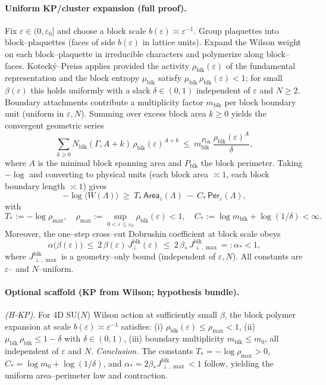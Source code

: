 \documentclass[11pt]{amsart}
\theoremstyle{plain}
\theoremstyle{definition}
\theoremstyle{remark}
\begin{document}
\paragraph{Uniform KP/cluster expansion (full proof).}
Fix $\varepsilon\in(0,\varepsilon_0]$ and choose a block scale $b(\varepsilon)\asymp \varepsilon^{-1}$. Group plaquettes into block–plaquettes (faces of side $b(\varepsilon)$ in lattice units). Expand the Wilson weight on each block–plaquette in irreducible characters and polymerize along block–faces. Koteck\'y–Preiss applies provided the activity $\rho_{\mathrm{blk}}(\varepsilon)$ of the fundamental representation and the block entropy $\mu_{\mathrm{blk}}$ satisfy $\mu_{\mathrm{blk}}\,\rho_{\mathrm{blk}}(\varepsilon) < 1$; for small $\beta(\varepsilon)$ this holds uniformly with a slack $\delta\in(0,1)$ independent of $\varepsilon$ and $N\ge2$. Boundary attachments contribute a multiplicity factor $m_{\mathrm{blk}}$ per block boundary unit (uniform in $\varepsilon,N$). Summing over excess block area $k\ge0$ yields the convergent geometric series
\[
  \sum_{k\ge 0} N_{\mathrm{blk}}(\Gamma,A+k)\,\rho_{\mathrm{blk}}(\varepsilon)^{A+k}
   \ \le\ m_{\mathrm{blk}}^{P_{\mathrm{blk}}}\,\frac{\rho_{\mathrm{blk}}(\varepsilon)^{A}}{\delta},
\]
where $A$ is the minimal block spanning area and $P_{\mathrm{blk}}$ the block perimeter. Taking $-\log$ and converting to physical units (each block area $\asymp 1$, each block boundary length $\asymp 1$) gives
\[
  -\log\langle W(\Lambda)\rangle\ \ge\ T_*\,\mathsf{Area}_\varepsilon(\Lambda)\ -\ C_*\,\mathsf{Per}_\varepsilon(\Lambda),
\]
with
\[
  T_*:= -\log \rho_{\max},\quad \rho_{\max}:=\sup_{0<\varepsilon\le\varepsilon_0}\rho_{\mathrm{blk}}(\varepsilon)<1,\quad
  C_*:= \log m_{\mathrm{blk}}+\log(1/\delta)<\infty.
\]
Moreover, the one–step cross–cut Dobrushin coefficient at block scale obeys
\[
  \alpha\bigl(\beta(\varepsilon)\bigr)\ \le\ 2\,\beta(\varepsilon)\,J^{\mathrm{blk}}_{\perp}(\varepsilon)
   \ \le\ 2\,\beta_*\,J^{\mathrm{blk}}_{\perp,\max}=:\alpha_*<1,
\]
where $J^{\mathrm{blk}}_{\perp,\max}$ is a geometry–only bound (independent of $\varepsilon,N$). All constants are $\varepsilon$– and $N$–uniform.

\paragraph{Optional scaffold (KP from Wilson; hypothesis bundle).}
\emph{(H-KP).} For 4D SU($N$) Wilson action at sufficiently small $\beta$, the block polymer expansion at scale $b(\varepsilon)\asymp \varepsilon^{-1}$ satisfies: (i) $\rho_{\mathrm{blk}}(\varepsilon)\le \rho_{\max}<1$, (ii) $\mu_{\mathrm{blk}}\,\rho_{\mathrm{blk}}\le 1-\delta$ with $\delta\in(0,1)$, (iii) boundary multiplicity $m_{\mathrm{blk}}\le m_0$, all independent of $\varepsilon$ and $N$. \emph{Conclusion.} The constants $T_*=-\log\rho_{\max}>0$, $C_* = \log m_0 + \log(1/\delta)$, and $\alpha_*=2\beta_* J^{\mathrm{blk}}_{\perp,\max}<1$ follow, yielding the uniform area–perimeter law and contraction.
\end{document}
